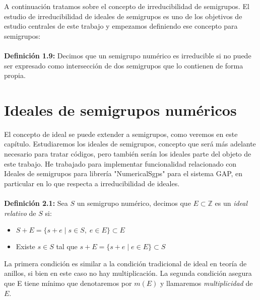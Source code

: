 \documentclass[11pt,spanish]{book}
\begin{document}
A continuación tratamos sobre el concepto de irreducibilidad de semigrupos. El estudio de irreducibilidad de ideales de semigrupos es uno de los objetivos de estudio centrales de este trabajo y empezamos definiendo ese concepto para semigrupos:\\
\\ \textbf{Definición 1.9: } Decimos que un semigrupo numérico es irreducible si no puede ser expresado como intersección de dos semigrupos que lo contienen de forma propia.


\chapter{Ideales de semigrupos numéricos}
El concepto de ideal se puede extender a semigrupos, como veremos en este capítulo. Estudiaremos los ideales de semigrupos, concepto que será más adelante necesario para tratar códigos, pero también serán los ideales parte del objeto de este trabajo. He trabajado para implementar funcionalidad relacionado con Ideales de semigrupos para librería "NumericalSgps" para el sistema GAP, en particular en lo que respecta a irreducibilidad de ideales. \\
\\ \textbf{Definición 2.1:} Sea $S$ un semigrupo numérico, decimos que $E\subset\mathbb{Z}$ es un \textit{ideal relativo} de $S$ si:
\begin{itemize}
    \item $S+E=\{s+e\; |\; s\in S,\; e\in E\}\subset E$
    \item Existe $s\in S$ tal que $s+E=\{s+e\; |\; e\in E\}\subset S$
\end{itemize}

La primera condición es similar a la condición tradicional de ideal en teoría de anillos, si bien en este caso no hay multiplicación. 
La segunda condición asegura que E tiene mínimo que denotaremos por $m(E)$ y llamaremos \textit{multiplicidad} de $E$.\\
\end{document}
